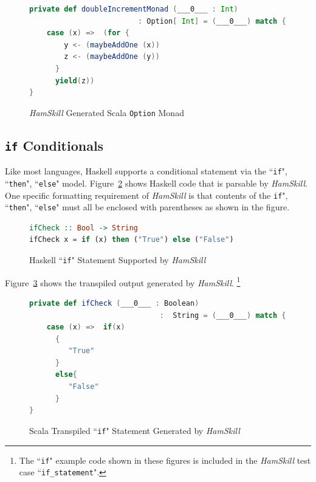 \documentclass{report}
\begin{document}
\begin{figure}[H]
\begin{mdframed}
\begin{lstlisting}[language=Scala, basicstyle=\small]
private def doubleIncrementMonad (___0___ : Int) 
                         : Option[ Int] = (___0___) match {
    case (x) =>  (for {
        y <- (maybeAddOne (x))
        z <- (maybeAddOne (y))
      }
      yield(z))
}
\end{lstlisting}
\end{mdframed}
\caption{\textit{HamSkill} Generated Scala \texttt{Option} Monad}
\label{fig:haskellOptionMonad}
\end{figure}

\subsection{\texttt{if} Conditionals}

Like most languages, Haskell supports a conditional statement via the ``\texttt{if}", ``\texttt{then}", ``\texttt{else}" model.  Figure~\ref{fig:haskellFunctionIfCheck} shows Haskell code that is parsable by \textit{HamSkill}.  One specific formatting requirement of \textit{HamSkill} is that contents of the \texttt{if}", ``\texttt{then}", ``\texttt{else}" must all be enclosed with parentheses as shown in the figure.

\begin{figure}[H]
\begin{mdframed}
\begin{lstlisting}[language=Haskell]
ifCheck :: Bool -> String
ifCheck x = if (x) then ("True") else ("False")
\end{lstlisting}
\end{mdframed}
\caption{Haskell ``\texttt{if}" Statement Supported by \textit{HamSkill}}\label{fig:haskellFunctionIfCheck}
\end{figure}

Figure~\ref{fig:scalaFunctionIfCheck} shows the transpiled output generated by \textit{HamSkill}. \footnote{The ``\texttt{if}" example code shown in these figures is included in the \textit{HamSkill} test case ``\texttt{if\_statement}".}

\begin{figure}[H]
\begin{mdframed}
\begin{lstlisting}[language=Scala, basicstyle=\small]
private def ifCheck (___0___ : Boolean) 
                              :  String = (___0___) match {
    case (x) =>  if(x)
      {
         "True"
      }
      else{
         "False"
      }
}
\end{lstlisting}
\end{mdframed}
\caption{Scala Transpiled ``\texttt{if}" Statement Generated by \textit{HamSkill}}\label{fig:scalaFunctionIfCheck}
\end{figure}
\end{document}
